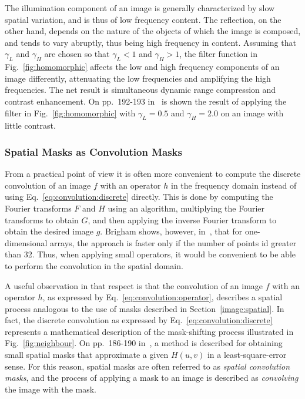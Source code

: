 The illumination component of an image is generally characterized by
slow spatial variation, and is thus of low frequency content.  The
reflection, on the other hand, depends on the nature of the objects of
which the image is composed, and tends to vary abruptly, thus being
high frequency in content.  Assuming that $\gamma_{L}$ and
$\gamma_{H}$ are chosen so that $\gamma_{L}<1$ and $\gamma_{H}>1$, the
filter function in Fig.~\ref{fig:homomorphic} affects the low and high
frequency components of an image differently, attenuating the low
frequencies and amplifying the high frequencies.  The net result is
simultaneous dynamic range compression and contrast enhancement.  On
pp.\ 192-193 in~\cite{digpic} is shown the result of applying the
filter in Fig.~\ref{fig:homomorphic} with $\gamma_{L}=0.5$ and
$\gamma_{H}=2.0$ on an image with little contrast.

\subsubsection{Spatial Masks as Convolution Masks}

From a practical point of view it is often more convenient to compute
the discrete convolution of an image $f$ with an operator $h$ in the
frequency domain instead of using Eq.~\ref{eq:convolution:discrete}
directly.  This is done by computing the Fourier transforms $F$ and
$H$ using an {\fft} algorithm, multiplying the Fourier transforms to
obtain $G$, and then applying the inverse Fourier transform to obtain
the desired image $g$.  Brigham shows, however, in~\cite{brigham},
that for one-dimensional arrays, the {\fft} approach is faster only if
the number of points id greater than 32.  Thus, when applying small
operators, it would be convenient to be able to perform the
convolution in the spatial domain.

A useful observation in that respect is that the convolution of an
image $f$ with an operator $h$, as expressed by
Eq.~\ref{eq:convolution:operator}, describes a spatial process
analogous to the use of masks described in
Section~\ref{image:spatial}.  In fact, the discrete convolution as
expressed by Eq.~\ref{eq:convolution:discrete} represents a
mathematical description of the mask-shifting process illustrated in
Fig.~\ref{fig:neighbour}.  On pp.\ 186-190 in~\cite{digim}, a method
is described for obtaining small spatial masks that approximate a
given $H(u,v)$ in a least-square-error sense.  For this reason,
spatial masks are often referred to as {\em spatial convolution
  masks\/}, and the process of applying a mask to an image is
described as {\em convolving\/} the image with the mask.
